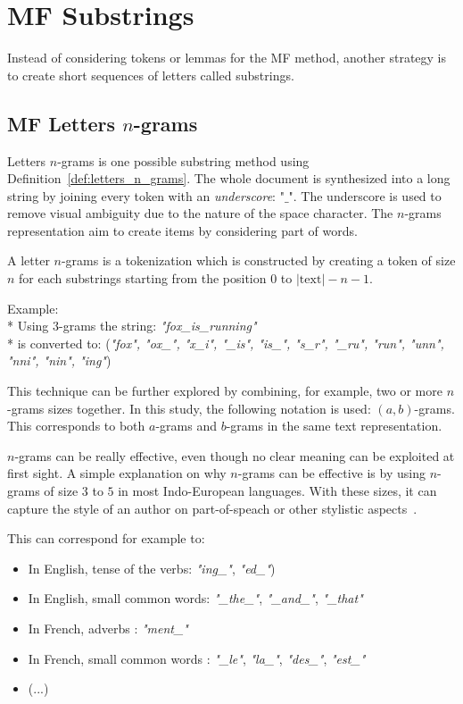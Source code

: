 \section{MF Substrings \label{sec:substrings}}

Instead of considering tokens or lemmas for the MF method, another strategy is to create short sequences of letters called substrings.

\subsection{MF Letters $n$-grams}

Letters $n$-grams is one possible substring method using Definition~\ref{def:letters_n_grams}.
The whole document is synthesized into a long string by joining every token with an \textit{underscore}: "$\_$".
The underscore is used to remove visual ambiguity due to the nature of the space character.
The $n$-grams representation aim to create items by considering part of words.

\begin{definition}
  A letter $n$-grams is a tokenization which is constructed by creating a token of size $n$ for each substrings starting from the position $0$ to $|\mathrm{text}| - n - 1$.

  Example: \\*
  Using $3$-grams the string: \textit{"fox\_is\_running"} \\*
  is converted to: (\textit{"fox", "ox\_", "x\_i", "\_is", "is\_", "s\_r", "\_ru", "run", "unn", "nni", "nin", "ing"})
\end{definition}

This technique can be further explored by combining, for example, two or more $n$-grams sizes together.
In this study, the following notation is used: $(a, b)$-grams.
This corresponds to both $a$-grams and $b$-grams in the same text representation.

$n$-grams can be really effective, even though no clear meaning can be exploited at first sight.
A simple explanation on why $n$-grams can be effective is by using $n$-grams of size $3$ to $5$ in most Indo-European languages.
With these sizes, it can capture the style of an author on part-of-speach or other stylistic aspects~\cite{ngrams_authorship}.

This can correspond for example to:
\begin{itemize}
  \item
  In English, tense of the verbs: \textit{"ing\_"}, \textit{"ed\_"})
  \item
  In English, small common words: \textit{"\_the\_"}, \textit{"\_and\_"}, \textit{"\_that"}
  \item
  In French, adverbs : \textit{"ment\_"}
  \item
  In French, small common words : \textit{"\_le"}, \textit{"la\_"}, \textit{"des\_"}, \textit{"est\_"}
  \item
  (...)
\end{itemize}


